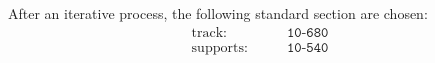 	After an iterative process, the following standard section are chosen:
	\begin{align*}
		\text{track:} \qquad & \texttt{10-680} \\
		\text{supports:} \qquad & \texttt{10-540} \\
	\end{align*}
	
	
	
	
	
	
	
	
	
	
	
	
	
	
	
	
	
	
	
	
	
	
	
	
	
	
	
	
	
	
	
	
	